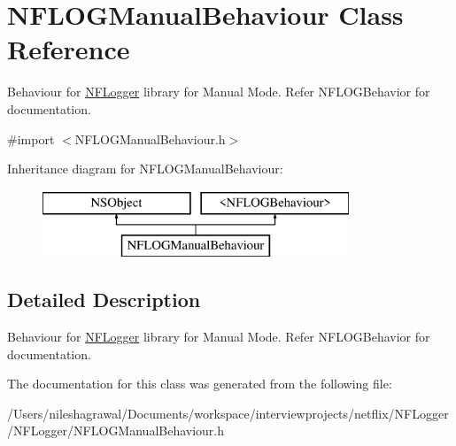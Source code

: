 \hypertarget{interface_n_f_l_o_g_manual_behaviour}{}\section{N\+F\+L\+O\+G\+Manual\+Behaviour Class Reference}
\label{interface_n_f_l_o_g_manual_behaviour}


Behaviour for \hyperlink{interface_n_f_logger}{N\+F\+Logger} library for Manual Mode. Refer N\+F\+L\+O\+G\+Behavior for documentation.  




{\ttfamily \#import $<$N\+F\+L\+O\+G\+Manual\+Behaviour.\+h$>$}

Inheritance diagram for N\+F\+L\+O\+G\+Manual\+Behaviour\+:\begin{figure}[H]
\begin{center}
\leavevmode
\includegraphics[height=2.000000cm]{interface_n_f_l_o_g_manual_behaviour}
\end{center}
\end{figure}


\subsection{Detailed Description}
Behaviour for \hyperlink{interface_n_f_logger}{N\+F\+Logger} library for Manual Mode. Refer N\+F\+L\+O\+G\+Behavior for documentation. 

The documentation for this class was generated from the following file\+:\begin{DoxyCompactItemize}
\item 
/\+Users/nileshagrawal/\+Documents/workspace/interviewprojects/netflix/\+N\+F\+Logger/\+N\+F\+Logger/N\+F\+L\+O\+G\+Manual\+Behaviour.\+h\end{DoxyCompactItemize}
